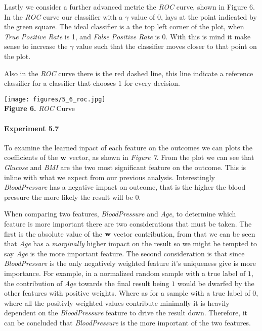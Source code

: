 \documentclass[11pt]{article}
\begin{document}
Lastly we consider a further advanced metric the \emph{ROC} curve, shown
in Figure 6. In the \emph{ROC} curve our classifier with a \(\gamma\)
value of 0, lays at the point indicated by the green square. The ideal
classifier is a the top left corner of the plot, when \emph{True
Positive Rate} is 1, and \emph{False Positive Rate} is 0. With this is
mind it make sense to increase the \(\gamma\) value such that the
classifier moves closer to that point on the plot.

Also in the \emph{ROC} curve there is the red dashed line, this line
indicate a reference classifier for a classifier that chooses \(1\) for
every decision.

\texttt{[image: figures/5\_6\_roc.jpg]}\\
\textbf{Figure 6.} \emph{ROC} Curve

    \hypertarget{experiment-5.7}{%
\paragraph{Experiment 5.7}\label{experiment-5.7}}

To examine the learned inpact of each feature on the outcomes we can
plots the coefficients of the \(\bf{w}\) vector, as shown in
\emph{Figure 7}. From the plot we can see that \emph{Glucose} and
\emph{BMI} are the two most significant feature on the outcome. This is
inline with what we expect from our previous analysis. Interestingly
\emph{BloodPressure} has a negative impact on outcome, that is the
higher the blood pressure the more likely the result will be \(0\).

When comparing two features, \emph{BloodPressure} and \emph{Age}, to
determine which feature is more important there are two considerations
that must be taken. The first is the absolute value of the \(\bf{w}\)
vector contribution, from that we can be seen that \emph{Age} has a
\emph{marginally} higher impact on the result so we might be tempted to
say \emph{Age} is the more important feature. The second consideration
is that since \emph{BloodPressure} is the only negatively weighted
feature it's uniqueness give is more importance. For example, in a
normalized random sample with a true label of \(1\), the contribution of
\emph{Age} towards the final result being \(1\) would be dwarfed by the
other features with positive weights. Where as for a sample with a true
label of \(0\), where all the positivly weighted values contribute
minimally it is heavily dependent on the \emph{BloodPressure} feature to
drive the result down. Therefore, it can be concluded that
\emph{BloodPressure} is the more important of the two features.
\end{document}
